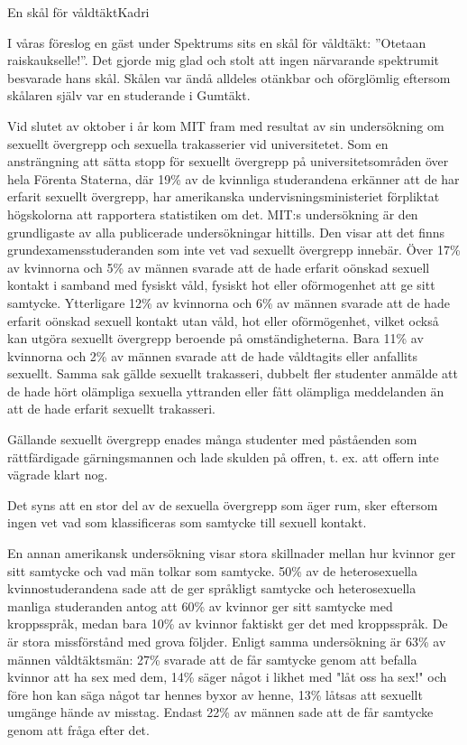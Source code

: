 \documentclass{spektraklet}
\begin{document}
\begin{artikel}{En skål för våldtäkt}{Kadri}

I våras föreslog en gäst under Spektrums sits en skål för våldtäkt: ''Otetaan raiskaukselle!''. 
Det gjorde mig glad och stolt att ingen närvarande spektrumit besvarade hans skål. Skålen var ändå alldeles otänkbar och oförglömlig eftersom skålaren själv var en studerande i Gumtäkt.

Vid slutet av oktober i år kom MIT fram med resultat av sin undersökning om sexuellt övergrepp och sexuella trakasserier vid universitetet. Som en ansträngning att sätta stopp för sexuellt övergrepp på universitetsområden över hela Förenta Staterna, där 19\% av de kvinnliga studerandena erkänner att de har erfarit sexuellt övergrepp, har amerikanska undervisningsministeriet förpliktat högskolorna att rapportera statistiken om det. MIT:s undersökning är den grundligaste av alla publicerade undersökningar hittills. Den visar att det finns grundexamensstuderanden som inte vet vad sexuellt övergrepp innebär. Över 17\% av kvinnorna och 5\% av männen svarade att de hade erfarit oönskad sexuell kontakt i samband med fysiskt våld, fysiskt hot eller oförmogenhet att ge sitt samtycke. Ytterligare 12\% av kvinnorna och 6\% av männen svarade att de hade erfarit oönskad sexuell kontakt utan våld, hot eller oförmögenhet, vilket också kan utgöra sexuellt övergrepp beroende på omständigheterna. Bara 11\% av kvinnorna och 2\% av männen svarade att de hade våldtagits eller anfallits sexuellt. Samma sak gällde sexuellt trakasseri, dubbelt fler studenter anmälde att de hade hört olämpliga sexuella yttranden eller fått olämpliga meddelanden än att de hade erfarit sexuellt trakasseri.

Gällande sexuellt övergrepp enades många studenter med påståenden som rättfärdigade gärningsmannen och lade skulden på offren, t. ex. att offern inte vägrade klart nog.

Det syns att en stor del av de sexuella övergrepp som äger rum, sker eftersom ingen vet vad som klassificeras som samtycke till sexuell kontakt.

En annan amerikansk undersökning visar stora skillnader mellan hur kvinnor ger sitt samtycke och vad män tolkar som samtycke. 50\% av de heterosexuella kvinnostuderandena sade att de ger språkligt samtycke och heterosexuella manliga studeranden antog att 60\% av kvinnor ger sitt samtycke med kroppsspråk, medan bara 10\% av kvinnor faktiskt ger det med kroppsspråk. De är stora missförstånd med grova följder. Enligt samma undersökning är 63\% av männen våldtäktsmän: 27\% svarade att de får samtycke genom att befalla kvinnor att ha sex med dem, 14\% säger något i likhet med "låt oss ha sex!" och före hon kan säga något tar hennes byxor av henne, 13\% låtsas att sexuellt umgänge hände av misstag. Endast 22\% av männen sade att de får samtycke genom att fråga efter det.


\end{artikel}
\end{document}
